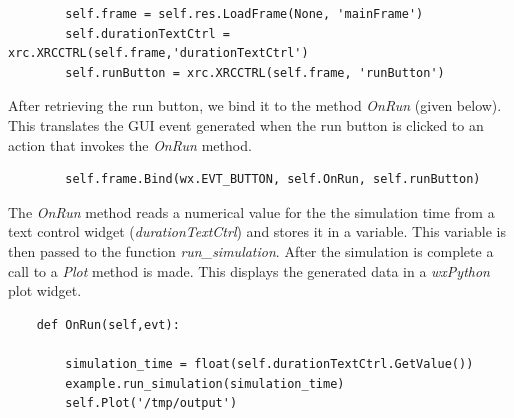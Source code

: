 \documentclass[12pt]{article}
\begin{document}
{\footnotesize
   \linenumbers
 \begin{verbatim}
        self.frame = self.res.LoadFrame(None, 'mainFrame')
        self.durationTextCtrl = xrc.XRCCTRL(self.frame,'durationTextCtrl')
        self.runButton = xrc.XRCCTRL(self.frame, 'runButton')
 \end{verbatim}
}

After retrieving the run button, we bind it to the method {\it OnRun}
(given below).  This translates the GUI event generated when
the run button is clicked to an action that invokes the {\it OnRun}
method.

{\footnotesize
   \linenumbers
 \begin{verbatim}
        self.frame.Bind(wx.EVT_BUTTON, self.OnRun, self.runButton)
 \end{verbatim} 
}



% 


The {\it OnRun} method reads a numerical value for the the simulation
time from a text control widget ({\it durationTextCtrl}) and stores it
in a variable.  This variable is then passed to the function {\it
  run\_simulation}.  After the simulation is complete a call to a {\it
  Plot} method is made. This displays the generated data in a {\it
  wxPython} plot widget.

{\footnotesize
  \linenumbers
\begin{verbatim}
    def OnRun(self,evt):

        simulation_time = float(self.durationTextCtrl.GetValue())
        example.run_simulation(simulation_time)
        self.Plot('/tmp/output')
\end{verbatim}
}
 
\end{document}
